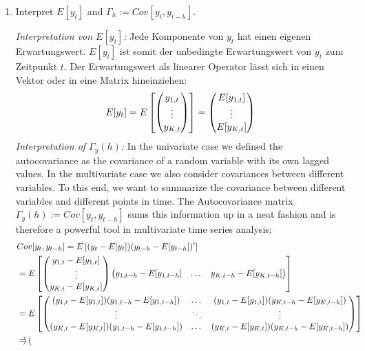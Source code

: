 \documentclass[a4paper]{scrartcl}
\begin{document}
\begin{enumerate}
\begin{solution}
	\end{solution}
\item Interpret $E[y_t]$ and $\Gamma_h := Cov[y_{t},y_{t-h}]$.
\begin{solution}
	\emph{Interpretation von $E[y_t]$:} Jede Komponente von $y_t$ hat einen eigenen Erwartungswert. $E[y_t]$ ist somit der unbedingte Erwartungswert von $y_t$ zum Zeitpunkt $t$. Der Erwartungswert als linearer Operator l\"{a}sst sich in einen Vektor oder in eine Matrix hineinziehen:
	\begin{align*}
	E[y_t] = E\left[\begin{pmatrix}y_{1,t} \cr \vdots \cr y_{K,t} \end{pmatrix} \right] = \begin{pmatrix}E[y_{1,t}] \cr \vdots \cr E[y_{K,t}] \end{pmatrix}
	\end{align*}
	\emph{Interpretation of $\Gamma_y(h)$:} In the univariate case we defined the autocovariance as the covariance of a random variable with its own lagged values. In the multivariate case we also consider covariances between different variables. To this end, we want to summarize the covariance between different variables and different points in time. The Autocovariance matrix ${\Gamma_y(h)} := Cov[{y_{t},{y_{t-h}}}]$ sums this information up in a neat fashion and is therefore a powerful tool in multivariate time series analysis:
	\begin{align*}
	&Cov[{y_{t},{y_{t-h}}}] = E\left[({y_{t}}-E[{{y_{t}}}]) ({y_{t-h}}-E[{{y_{t-h}}}])' \right]\\
	&= E\left[\begin{pmatrix}y_{1,t} - E[y_{1,t}] \cr \vdots \cr y_{K,t} - E[y_{K,t}] \end{pmatrix} \begin{pmatrix} y_{1,{t-h}} - E[y_{1,{t-h}}] & \dots & y_{K,{t-h}} - E[y_{K,{t-h}}]  \end{pmatrix} \right]\\
	&= E\left[\begin{pmatrix}
	(y_{1,t}- E[y_{1,t}])(y_{1,{t-h}} - E[y_{1,{t-h}}]) & \dots & (y_{1,t} - E[y_{1,t}])(y_{K,{t-h}} - E[y_{K,{t-h}}])\\
	\vdots & \ddots & \vdots\\
	(y_{K,t}- E[y_{K,t}])(y_{1,{t-h}} - E[y_{1,{t-h}}]) & \dots & (y_{K,t} - E[y_{K,t}])(y_{K,{t-h}} - E[y_{K,{t-h}}])
	\end{pmatrix} \right]\\
	&= \begin{pmatrix}

\end{pmatrix}
\end{align*}
\end{solution}
\end{enumerate}
\end{document}

